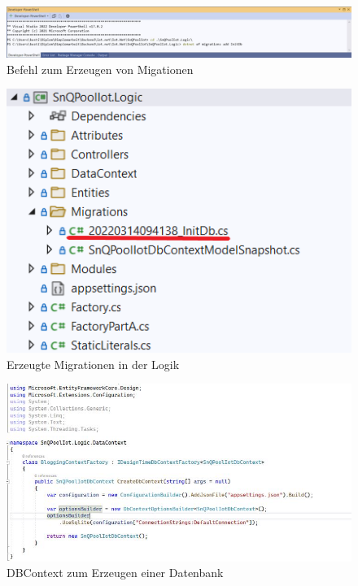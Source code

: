 \begin{figure}[H]
    \centering
    \includegraphics[width=1\textwidth]{pics/DeveloperPowerShellMigration.JPG}
    \caption{Befehl zum Erzeugen von Migationen}
\end{figure}

\begin{figure}[H]
    \centering
    \includegraphics[width=1\textwidth]{pics/MigrationCreated.png}
    \caption{Erzeugte Migrationen in der Logik}
\end{figure}

\begin{figure}[H]
    \centering
    \includegraphics[width=1\textwidth]{pics/DBContext.JPG}
    \caption{DBContext zum Erzeugen einer Datenbank}
\end{figure}

